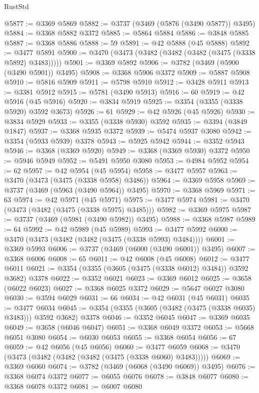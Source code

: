 \begin{lexlean}{RustStd}
\begin{coremodule}
@5877 := @3369 @5869
@5882 := @3737 (@3469 (@5876 (@3490 @5877)) @3495)
@5884 := @3368 @5882 @3372
@5885 := @5864 @5884
@5886 := @3848 @5885
@5887 := @3368 @5886
@5888 := 59
@5891 := @42 @5888 (@45 @5888)
@5892 := @3477 @5891
@5900 := @3470 (@3473 (@3482 (@3482 (@3482 (@3475 (@3338 @5892) @3483)))))
@5901 := @3369 @5892
@5906 := @3782 (@3469 (@5900 (@3490 @5901)) @3495)
@5908 := @3368 @5906 @3372
@5909 := @5887 @5908
@5910 := @5816 @5909
@5911 := @5798 @5910
@5912 := @3428 @5911
@5913 := @3381 @5912
@5915 := @5781 (@3490 @5913)
@5916 := 60
@5919 := @42 @5916 (@45 @5916)
@5920 := @3834 @5919
@5925 := @3354 (@3355 (@3338 @5920) @3592 @3673)
@5926 := 61
@5929 := @42 @5926 (@45 @5926)
@5930 := @3834 @5929
@5933 := @3355 (@3338 @5930) @3592
@5935 := @3394 (@3849 @1847)
@5937 := @3368 @5935 @3372
@5939 := @5474 @5937 @3080
@5942 := @3354 (@5933 @5939) @3378
@5943 := @5925 @5942
@5944 := @3352 @5943
@5946 := @3368 (@3369 @5920)
@5949 := @3368 (@3369 @5930) @3372
@5950 := @5946 @5949
@5952 := @5491 @5950 @3080
@5953 := @4984 @5952
@5954 := 62
@5957 := @42 @5954 (@45 @5954)
@5958 := @3477 @5957
@5963 := @3470 (@3473 (@3475 (@3338 @5958) @3486))
@5964 := @3369 @5958
@5969 := @3737 (@3469 (@5963 (@3490 @5964)) @3495)
@5970 := @3368 @5969
@5971 := 63
@5974 := @42 @5971 (@45 @5971)
@5975 := @3477 @5974
@5981 := @3470 (@3473 (@3482 (@3475 (@3338 @5975) @3485)))
@5982 := @3369 @5975
@5987 := @3737 (@3469 (@5981 (@3490 @5982)) @3495)
@5988 := @3368 @5987
@5989 := 64
@5992 := @42 @5989 (@45 @5989)
@5993 := @3477 @5992
@6000 := @3470 (@3473 (@3482 (@3482 (@3475 (@3338 @5993) @3484))))
@6001 := @3369 @5993
@6006 := @3737 (@3469 (@6000 (@3490 @6001)) @3495)
@6007 := @3368 @6006
@6008 := 65
@6011 := @42 @6008 (@45 @6008)
@6012 := @3477 @6011
@6021 := @3354 (@3355 (@3605 (@3475 (@3338 @6012) @3484)) @3592 @3682) @3378
@6022 := @3352 @6021
@6023 := @3369 @6012
@6025 := @3658 (@6022 @6023)
@6027 := @3368 @6025 @3372
@6029 := @5647 @6027 @3080
@6030 := @3594 @6029
@6031 := 66
@6034 := @42 @6031 (@45 @6031)
@6035 := @3477 @6034
@6045 := @3354 (@3355 (@3605 (@3482 (@3475 (@3338 @6035) @3483))) @3592 @3682) @3378
@6046 := @3352 @6045
@6047 := @3369 @6035
@6049 := @3658 (@6046 @6047)
@6051 := @3368 @6049 @3372
@6053 := @5668 @6051 @3080
@6054 := @6030 @6053
@6055 := @3368 @6054
@6056 := 67
@6059 := @42 @6056 (@45 @6056)
@6060 := @3477 @6059
@6068 := @3470 (@3473 (@3482 (@3482 (@3482 (@3475 (@3338 @6060) @3483)))))
@6069 := @3369 @6060
@6074 := @3782 (@3469 (@6068 (@3490 @6069)) @3495)
@6076 := @3368 @6074 @3372
@6077 := @6055 @6076
@6078 := @3848 @6077
@6080 := @3368 @6078 @3372
@6081 := @6007 @6080

\end{coremodule}
\end{lexlean}
